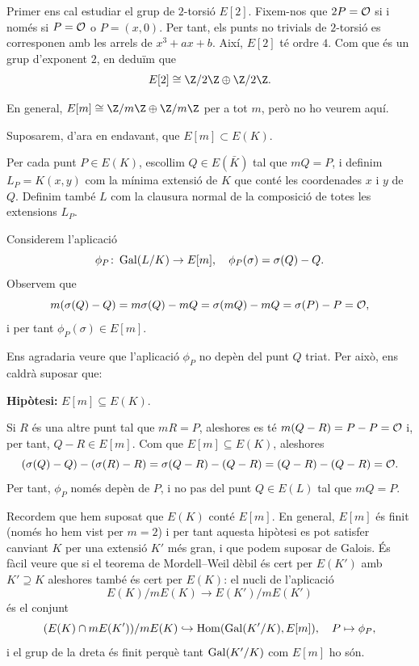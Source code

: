  Primer ens cal estudiar el grup de $2$-torsió $E[2]$. Fixem-nos que $2P=\mathcal{O}$ si i només si $P=\mathcal{O}$ o $P=(x,0)$. Per tant, els punts no trivials de $2$-torsió es corresponen amb les arrels de $x^3+ax+b$. Així, $E[2]$ té ordre $4$. Com que és un grup d'exponent $2$, en deduïm que
 \[
 E[2] \cong \Z/2\Z \oplus \Z/2\Z.
 \]
\begin{remark}
 En general, $E[m]\cong \Z/m\Z\oplus \Z/m\Z$ per a tot $m$, però no ho veurem aquí.
\end{remark}

Suposarem, d'ara en endavant, que $E[m]\subset E(K)$.

Per cada punt $P\in E(K)$, escollim $Q\in E(\bar K)$ tal que $mQ=P$, i definim $L_P=K(x,y)$ com la mínima extensió de $K$ que conté les coordenades $x$ i $y$ de $Q$. Definim també $L$ com la clausura normal de la composició de totes les extensions $L_P$.

Considerem l'aplicació
\[
\phi_P\colon \operatorname{Gal}(L/K)\to E[m],\quad \phi_P(\sigma) = \sigma(Q)-Q.
\]
Observem que
\[
m(\sigma(Q)-Q) = m\sigma(Q)-mQ= \sigma(mQ)- mQ = \sigma(P)-P = \mathcal{O},
\]
i per tant $\phi_P(\sigma)\in E[m]$.

Ens agradaria veure que l'aplicació $\phi_P$ no depèn del punt $Q$ triat. Per això, ens caldrà suposar que:

\textbf{Hipòtesi: } $E[m]\subseteq E(K)$.

Si $R$ és una altre punt tal que $mR=P$, aleshores es té $m(Q-R)=P-P=\mathcal{O}$ i, per tant, $Q-R\in E[m]$. Com que $E[m]\subseteq E(K)$, aleshores
\[
(\sigma(Q)-Q) - (\sigma(R)-R) = \sigma(Q-R)-(Q-R) = (Q-R)-(Q-R)=\mathcal{O}.
\]
Per tant, $\phi_P$ només depèn de $P$, i no pas del punt $Q\in E(L)$ tal que $mQ=P$.

\begin{remark}
Recordem que hem suposat que $E(K)$ conté $E[m]$. En general, $E[m]$ és finit (només ho hem vist per $m=2$) i per tant aquesta hipòtesi es pot satisfer canviant $K$ per una extensió $K'$ més gran, i que podem suposar de Galois. És fàcil veure que si el teorema de Mordell--Weil dèbil és cert per $E(K')$ amb $K'\supseteq K$ aleshores també és cert per $E(K)$: el nucli de l'aplicació
\[
E(K)/mE(K)\to E(K')/mE(K')
\]
és el conjunt
\[
(E(K)\cap mE(K'))/mE(K)\hookrightarrow \operatorname{Hom}(\operatorname{Gal}(K'/K), E[m]),\quad P\mapsto\phi_P,
\]
i el grup de la dreta és finit perquè tant $\operatorname{Gal}(K'/K)$ com $E[m]$ ho són.
\end{remark}


